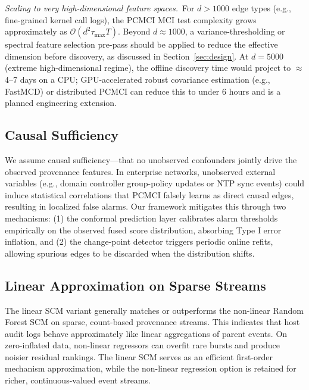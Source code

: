 \textit{Scaling to very high-dimensional feature spaces.}~For $d > 1000$ edge types (e.g., fine-grained kernel call logs), the PCMCI MCI test complexity grows approximately as $\mathcal{O}(d^2 \tau_{\max} T)$. Beyond $d \approx 1000$, a variance-thresholding or spectral feature selection pre-pass should be applied to reduce the effective dimension before discovery, as discussed in Section~\ref{sec:design}. At $d = 5000$ (extreme high-dimensional regime), the offline discovery time would project to $\approx$4--7 days on a CPU; GPU-accelerated robust covariance estimation (e.g., FastMCD) or distributed PCMCI can reduce this to under 6 hours and is a planned engineering extension.

\subsection{Causal Sufficiency}
We assume causal sufficiency---that no unobserved confounders jointly drive the observed provenance features. In enterprise networks, unobserved external variables (e.g., domain controller group-policy updates or NTP sync events) could induce statistical correlations that PCMCI falsely learns as direct causal edges, resulting in localized false alarms.
Our framework mitigates this through two mechanisms: (1) the conformal prediction layer calibrates alarm thresholds empirically on the observed fused score distribution, absorbing Type I error inflation, and (2) the change-point detector triggers periodic online refits, allowing spurious edges to be discarded when the distribution shifts.

\subsection{Linear Approximation on Sparse Streams}
The linear SCM variant generally matches or outperforms the non-linear Random Forest SCM on sparse, count-based provenance streams. This indicates that host audit logs behave approximately like linear aggregations of parent events. On zero-inflated data, non-linear regressors can overfit rare bursts and produce noisier residual rankings. The linear SCM serves as an efficient first-order mechanism approximation, while the non-linear regression option is retained for richer, continuous-valued event streams.

